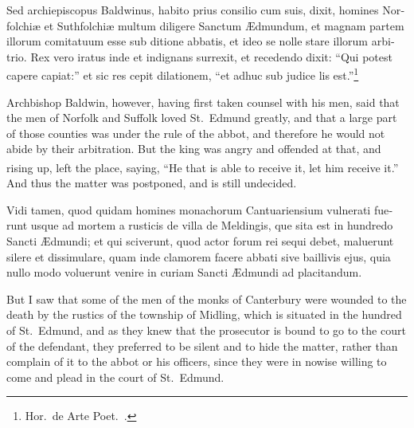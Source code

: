 \documentclass[10pt]{book}
\newcounter{engnote}
\newcommand{\engnotenum}{\textsuperscript{\arabic{engnote}\stepcounter{engnote}}}
\newcommand{\engnotetext}[1]{\vphantom{\footnotemark{}}\footnotetext{#1}}
\begin{document}
\begin{paracol}{2}
\switchcolumn*

\begin{otherlanguage}{latin}
Sed archiepiscopus Baldwinus, habito prius consilio cum suis, dixit, homines Norfolchi\ae{} et Suthfolchi\ae{} multum diligere Sanctum \AE{}dmundum, et magnam partem illorum comitatuum esse sub ditione abbatis, et ideo se nolle stare illorum arbitrio. Rex vero iratus inde et indignans surrexit, et recedendo dixit: ``Qui potest capere capiat:''\engnotetext{Matt.\ xix., \oldstylenums{12}.} et sic res cepit dilationem, ``et adhuc sub judice lis est.''\footnote[\textdagger]{Hor.\ de Arte Poet.\ .}
\end{otherlanguage}

\switchcolumn

Archbishop Baldwin, however, having first taken counsel with his men, said that the men of Norfolk and Suffolk loved St.\ Edmund greatly, and that a large part of those counties was under the rule of the abbot, and therefore he would not abide by their arbitration. But the king was angry and offended at that, and rising up, left the place, saying, ``He that is able to receive it, let him receive it.''\engnotenum{} And thus the matter was postponed, and is still undecided.

\switchcolumn*

\begin{otherlanguage}{latin}
Vidi tamen, quod quidam homines monachorum Cantuariensium vulnerati fuerunt usque ad mortem a rusticis de villa de Meldingis, que sita est in hundredo Sancti \AE{}dmundi; et qui sciverunt, quod actor forum rei sequi debet, maluerunt silere et dissimulare, quam inde clamorem facere abbati sive baillivis ejus, quia nullo modo voluerunt venire in curiam Sancti \AE{}dmundi ad placitandum.
\end{otherlanguage}

\switchcolumn

But I saw that some of the men of the monks of Canterbury were wounded to the death by the rustics of the township of Midling, which is situated in the hundred of St.\ Edmund, and as they knew that the prosecutor is bound to go to the court of the defendant, they preferred to be silent and to hide the matter, rather than complain of it to the abbot or his officers, since they were in nowise willing to come and plead in the court of St.\ Edmund.

\switchcolumn*


\end{paracol}
\end{document}
